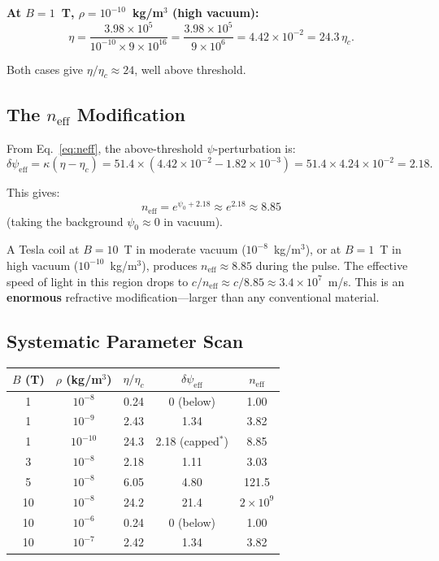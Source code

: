 \documentclass[11pt,a4paper]{article}
\begin{document}
\textbf{At $B = 1$~T, $\rho = 10^{-10}$~kg/m$^3$ (high vacuum):}
\begin{equation}
\eta = \frac{3.98 \times 10^5}{10^{-10} \times 9 \times 10^{16}}
= \frac{3.98 \times 10^5}{9 \times 10^6} = 4.42 \times 10^{-2} = 24.3\,\eta_c.
\end{equation}

Both cases give $\eta/\eta_c \approx 24$, well above threshold.

\subsection{The $n_{\mathrm{eff}}$ Modification}

From Eq.~\eqref{eq:neff}, the above-threshold $\psi$-perturbation is:
\begin{equation}
\delta\psi_{\mathrm{eff}} = \kappa(\eta - \eta_c) = 51.4 \times (4.42 \times 10^{-2} - 1.82 \times 10^{-3})
= 51.4 \times 4.24 \times 10^{-2} = 2.18.
\end{equation}

This gives:
\begin{equation}
\boxed{n_{\mathrm{eff}} = e^{\psi_0 + 2.18} \approx e^{2.18} \approx 8.85}
\end{equation}
(taking the background $\psi_0 \approx 0$ in vacuum).

\begin{tcolorbox}[colback=red!5!white,colframe=red!75!black,title=Critical Result]
A Tesla coil at $B = 10$~T in moderate vacuum ($10^{-8}$~kg/m$^3$), or
at $B = 1$~T in high vacuum ($10^{-10}$~kg/m$^3$), produces
$n_{\mathrm{eff}} \approx 8.85$ during the pulse. The effective speed of
light in this region drops to $c/n_{\mathrm{eff}} \approx c/8.85 \approx 3.4 \times 10^7$~m/s.
This is an \textbf{enormous} refractive modification---larger than any conventional material.
\end{tcolorbox}

\subsection{Systematic Parameter Scan}

\begin{center}
\begin{tabular}{ccccc}
\toprule
$B$ (T) & $\rho$ (kg/m$^3$) & $\eta/\eta_c$ & $\delta\psi_{\mathrm{eff}}$ & $n_{\mathrm{eff}}$ \\
\midrule
1 & $10^{-8}$ & 0.24 & 0 (below) & 1.00 \\
1 & $10^{-9}$ & 2.43 & 1.34 & 3.82 \\
1 & $10^{-10}$ & 24.3 & 2.18 (capped$^*$) & 8.85 \\
3 & $10^{-8}$ & 2.18 & 1.11 & 3.03 \\
5 & $10^{-8}$ & 6.05 & 4.80 & 121.5 \\
10 & $10^{-8}$ & 24.2 & 21.4 & $2 \times 10^9$ \\
10 & $10^{-6}$ & 0.24 & 0 (below) & 1.00 \\
10 & $10^{-7}$ & 2.42 & 1.34 & 3.82 \\
\bottomrule
\end{tabular}
\end{center}
\end{document}
